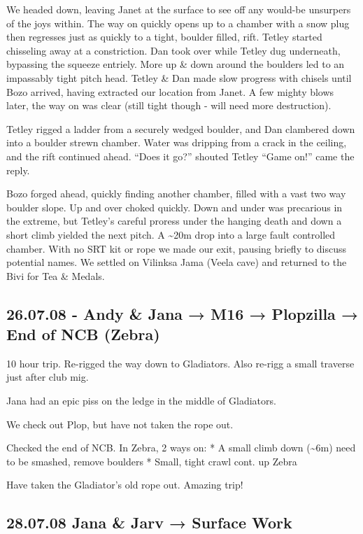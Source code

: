 We headed down, leaving Janet at the surface to see off any would-be
unsurpers of the joys within. The way on quickly opens up to a chamber
with a snow plug then regresses just as quickly to a tight, boulder
filled, rift. Tetley started chisseling away at a constriction. Dan took
over while Tetley dug underneath, bypassing the squeeze entriely. More
up \& down around the boulders led to an impassably tight pitch head.
Tetley \& Dan made slow progress with chisels until Bozo arrived, having
extracted our location from Janet. A few mighty blows later, the way on
was clear (still tight though - will need more destruction).

Tetley rigged a ladder from a securely wedged boulder, and Dan clambered
down into a boulder strewn chamber. Water was dripping from a crack in
the ceiling, and the rift continued ahead. ``Does it go?'' shouted
Tetley ``Game on!'' came the reply.

Bozo forged ahead, quickly finding another chamber, filled with a vast
two way boulder slope. Up and over choked quickly. Down and under was
precarious in the extreme, but Tetley's careful proress under the
hanging death and down a short climb yielded the next pitch. A
\textasciitilde{}20m drop into a large fault controlled chamber. With no
SRT kit or rope we made our exit, pausing briefly to discuss potential
names. We settled on Vilinksa Jama (Veela cave) and returned to the Bivi
for Tea \& Medals. 

\subsection{26.07.08 - Andy \& Jana → M16 → Plopzilla → End of NCB
(Zebra)}\label{andy-jana-m16-plopzilla-end-of-ncb-zebra}

10 hour trip. Re-rigged the way down to Gladiators. Also re-rigg a small
traverse just after club mig.

Jana had an epic piss on the ledge in the middle of Gladiators.

We check out Plop, but have not taken the rope out.

Checked the end of NCB. In Zebra, 2 ways on: * A small climb down
(\textasciitilde{}6m) need to be smashed, remove boulders * Small, tight
crawl cont. up Zebra

Have taken the Gladiator's old rope out. Amazing trip! 

\subsection{28.07.08 Jana \& Jarv → Surface
Work}\label{jana-jarv-surface-work}

